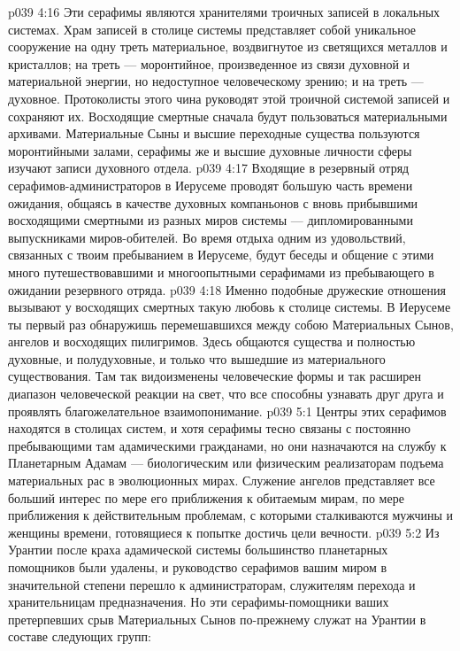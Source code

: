 \vs p039 4:16 \bibnobreakspace {} Эти серафимы являются хранителями троичных записей в локальных системах. Храм записей в столице системы представляет собой уникальное сооружение на одну треть материальное, воздвигнутое из светящихся металлов и кристаллов; на треть --- моронтийное, произведенное из связи духовной и материальной энергии, но недоступное человеческому зрению; и на треть --- духовное. Протоколисты этого чина руководят этой троичной системой записей и сохраняют их. Восходящие смертные сначала будут пользоваться материальными архивами. Материальные Сыны и высшие переходные существа пользуются моронтийными залами, серафимы же и высшие духовные личности сферы изучают записи духовного отдела.
\vs p039 4:17 \bibnobreakspace {} Входящие в резервный отряд серафимов\hyp{}администраторов в Иерусеме проводят большую часть времени ожидания, общаясь в качестве духовных компаньонов с вновь прибывшими восходящими смертными из разных миров системы --- дипломированными выпускниками миров\hyp{}обителей. Во время отдыха одним из удовольствий, связанных с твоим пребыванием в Иерусеме, будут беседы и общение с этими много путешествовавшими и многоопытными серафимами из пребывающего в ожидании резервного отряда.
\vs p039 4:18 Именно подобные дружеские отношения вызывают у восходящих смертных такую любовь к столице системы. В Иерусеме ты первый раз обнаружишь перемешавшихся между собою Материальных Сынов, ангелов и восходящих пилигримов. Здесь общаются существа и полностью духовные, и полудуховные, и только что вышедшие из материального существования. Там так видоизменены человеческие формы и так расширен диапазон человеческой реакции на свет, что все способны узнавать друг друга и проявлять благожелательное взаимопонимание.
\vs p039 5:1 Центры этих серафимов находятся в столицах систем, и хотя серафимы тесно связаны с постоянно пребывающими там адамическими гражданами, но они назначаются на службу к Планетарным Адамам --- биологическим или физическим реализаторам подъема материальных рас в эволюционных мирах. Служение ангелов представляет все больший интерес по мере его приближения к обитаемым мирам, по мере приближения к действительным проблемам, с которыми сталкиваются мужчины и женщины времени, готовящиеся к попытке достичь цели вечности.
\vs p039 5:2 Из Урантии после краха адамической системы большинство планетарных помощников были удалены, и руководство серафимов вашим миром в значительной степени перешло к администраторам, служителям перехода и хранительницам предназначения. Но эти серафимы\hyp{}помощники ваших претерпевших срыв Материальных Сынов по\hyp{}прежнему служат на Урантии в составе следующих групп:
